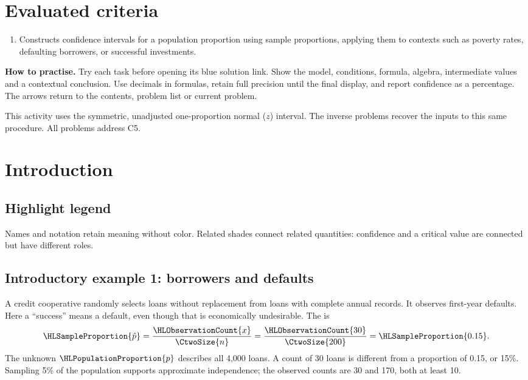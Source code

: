 \section*{Evaluated criteria}
\begin{enumerate}[label=\textbf{C\arabic*},start=5]
\item Constructs confidence intervals for a population proportion using sample proportions, applying them to contexts such as poverty rates, defaulting borrowers, or successful investments.
\end{enumerate}
\textbf{How to practise.} Try each task before opening its blue solution link. Show the model, conditions, formula, algebra, intermediate values and a contextual conclusion. Use decimals in formulas, retain full precision until the final display, and report confidence as a percentage. The arrows return to the contents, problem list or current problem.

This activity uses the symmetric, unadjusted one-proportion normal ($z$) interval. The inverse problems recover the inputs to this same procedure. All problems address C5.
\clearpage

\section{Introduction}\label{sec:introduction}
\subsection*{Highlight legend}
\label{tab:highlight-legend}
Names and notation retain meaning without color. Related shades connect related quantities: confidence and a critical value are connected but have different roles.

\subsection{Introductory example 1: borrowers and defaults}\label{ex:intro-one}
A credit cooperative randomly selects  loans without replacement from  loans with complete annual records. It observes  first-year defaults. Here a ``success'' means a default, even though that is economically undesirable. The  is
\[
\HLSampleProportion{\hat p}=\frac{\HLObservationCount{x}}{\CtwoSize{n}}
=\frac{\HLObservationCount{30}}{\CtwoSize{200}}=\HLSampleProportion{0.15}.
\]
The unknown  $\HLPopulationProportion{p}$ describes all 4,000 loans. A count of 30 loans is different from a proportion of 0.15, or 15\%. Sampling 5\% of the population supports approximate independence; the observed counts are 30 and 170, both at least 10.

